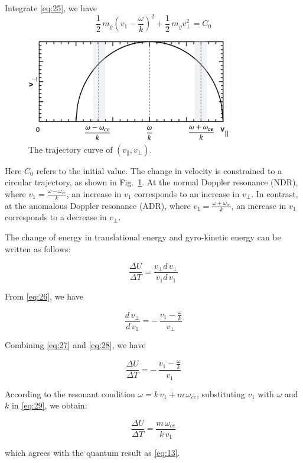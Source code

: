 \documentclass{cpbtex}
\begin{document}
\begin{CJK*}{GBK}{song}
Integrate \eqref{eq:25}, we have
\begin{equation}
\frac{1}{2}\,m_{\varrho}\left(v_{1}-\frac{\omega}{k}\right)^{2}+\frac{1}{2}\,m_{\varrho}v_{\perp}^{2}=C_{0}
\label{eq:26}
\end{equation}
\begin{figure}[htbp]
\centering
\includegraphics[width=0.8\textwidth]{Figure8.eps}%
\caption{\label{fig:8}The trajectory curve of $ (v_\parallel,v_\perp)$.}
\end{figure}
Here $C_{0}$ refers to the initial value. The change in velocity is constrained to a circular trajectory, as shown in Fig.~\ref{fig:8}. At the normal Doppler resonance (NDR), where $v_{1}=\frac{\omega-\omega_{ce}}{k}$, an increase in $v_{1}$ corresponds to an increase in $v_{\perp}$. In contrast, at the anomalous Doppler resonance (ADR), where $v_{1}=\frac{\omega+\omega_{ce}}{k}$, an increase in $v_{1}$ corresponds to a decrease in $v_{\perp}$.

The change of energy in translational energy and gyro-kinetic energy can be written as follows:

\begin{equation}
\frac{\Delta U}{\Delta T}=\frac{v_{\perp}d\,v_{\perp}}{v_{1}d\,v_{1}}
\label{eq:27}
\end{equation}

From \eqref{eq:26}, we have

\begin{equation}
\frac{d\,v_{\perp}}{d\,v_{1}}=-\,\frac{v_{1}-\frac{\omega}{k}}{v_{\perp}}
\label{eq:28}
\end{equation}

Combining \eqref{eq:27} and \eqref{eq:28}, we have

\begin{equation}
\frac{\Delta U}{\Delta T}=-\,\frac{v_{1}-\frac{\omega}{k}}{v_{1}}
\label{eq:29}
\end{equation}

According to the resonant condition $\omega=k\,v_{1}+m\,\omega_{ce}$, substituting $v_{1}$ with $\omega$ and $k$ in \eqref{eq:29}, we obtain:

\begin{equation}
\frac{\Delta U}{\Delta T}=\frac{m\,\omega_{ce}}{k\,v_{1}}
\label{eq:30}
\end{equation}

which agrees with the quantum result as \eqref{eq:13}.






\end{CJK*}  %
\end{document}
